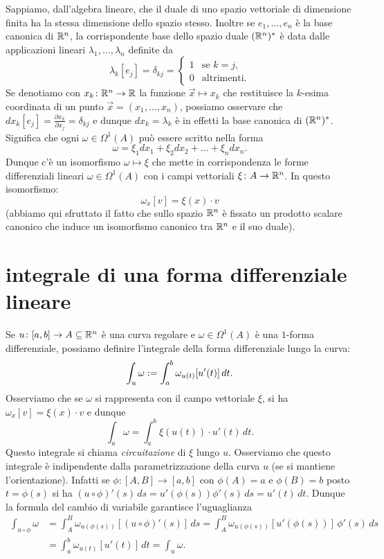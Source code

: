 Sappiamo, dall'algebra lineare, che il duale di uno spazio vettoriale 
di dimensione finita ha la stessa dimensione dello spazio stesso. 
Inoltre se $e_1,\dots, e_n$ è la base canonica di ${\mathbb R}^n$,
la corrispondente base dello spazio duale $({\mathbb R}^n)^*$ è data 
dalle applicazioni lineari $\lambda_1,\dots, \lambda_n$ definite 
da 
\[
  \lambda_k[e_j]=\delta_{kj} = \begin{cases}
  1 & \text{se } k=j,\\
  0 & \text{altrimenti.}
  \end{cases}
\]
Se denotiamo con $x_k\colon {\mathbb R}^n \to {\mathbb R}$ la funzione $\vec x \mapsto x_k$ 
che restituisce la $k$-esima coordinata di un punto $\vec x = (x_1,\dots, x_n)$, 
possiamo osservare che $dx_k[e_j] = \frac{\partial x_k}{\partial x_j} = \delta_{kj}$ 
e dunque $dx_k = \lambda_k$ è in effetti la base canonica di $({\mathbb R}^n)^*$. 
Significa che ogni $\omega \in \Omega^1(A)$ può essere scritto 
nella forma 
\[
   \omega = \xi_1 dx_1 + \xi_2 dx_2 + \dots + \xi_n dx_n.
\]
Dunque c'è un isomorfismo $\omega \mapsto \xi$ che mette in 
corrispondenza le forme differenziali lineari $\omega \in \Omega^1(A)$ 
con i campi vettoriali $\xi \colon A\to {\mathbb R}^n$.
In questo isomorfismo:
\[
  \omega_x[v] = \xi(x) \cdot v
\]
(abbiamo qui sfruttato il fatto che sullo spazio ${\mathbb R}^n$ è fissato un prodotto 
scalare canonico che induce un isomorfismo canonico tra ${\mathbb R}^n$ 
e il suo duale).

\section{integrale di una forma differenziale lineare}

Se $u\colon [a,b]\to A\subseteq {\mathbb R}^n$ è una curva regolare e $\omega\in \Omega^1(A)$ 
è una $1$-forma differenziale, possiamo definire l'integrale della forma differenziale lungo la curva:
\begin{equation}\label{def:integrale_forma_1}
 \int_u \omega := \int_a^b \omega_{u(t)}[u'(t)]\, dt.
\end{equation}
Osserviamo che se $\omega$ si rappresenta con il campo vettoriale $\xi$, 
si ha $\omega_x[v] = \xi(x)\cdot v$ 
e dunque 
\[
 \int_u \omega = \int_a^b \xi(u(t))\cdot u'(t)\, dt.
\]
Questo integrale si chiama \emph{circuitazione} di $\xi$ lungo $u$.
Osserviamo che questo integrale è indipendente dalla parametrizzazione della curva $u$
(se si mantiene l'orientazione).
Infatti se $\phi\colon [A,B]\to [a,b]$ con $\phi(A)=a$ e $\phi(B)=b$ 
posto $t=\phi(s)$ si ha $(u\circ \phi)'(s)\, ds = u'(\phi(s)) \phi'(s)\, ds = u'(t)\, dt$.
Dunque la formula del cambio di variabile garantisce l'uguaglianza
\begin{align*}
  \int_{u\circ \phi} \omega 
  &= \int_A^B \omega_{u(\phi(s))}[(u\circ \phi)'(s)]\, ds
  = \int_A^B \omega_{u(\phi(s))}[u'(\phi(s))]\, \phi'(s)\, ds\\
  &= \int_a^b \omega_{u(t)}[u'(t)]\, dt = \int_u \omega.
\end{align*}

